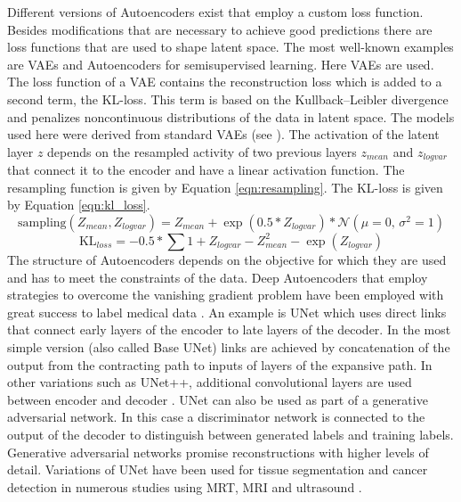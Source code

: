 Different versions of Autoencoders exist that employ a custom loss function. Besides modifications that are necessary to achieve good predictions there are loss functions that are used to shape latent space. The most well-known examples are VAEs and Autoencoders for semisupervised learning. Here VAEs are used. The loss function of a VAE contains the reconstruction loss which is added to a second term, the KL-loss. This term is based on the Kullback–Leibler divergence and penalizes noncontinuous distributions of the data in latent space. The models used here were derived from standard VAEs (see \cite{keras2021vaes}). The activation of the latent layer $z$ depends on the resampled activity of two previous layers $z_{mean}$ and $z_{logvar}$ that connect it to the encoder and have a linear activation function. The resampling function is given by Equation \ref{eqn:resampling}. The KL-loss is given by Equation \ref{eqn:kl_loss}.\\
\begin{equation}
\text{sampling}(Z_{mean}, Z_{log var}) = Z_{mean}+ \exp(0.5 * Z_{log var}) * \mathcal{N}(\mu = 0,\,\sigma^{2}=1)
\label{eqn:resampling}
\end{equation}
\begin{equation}
  \text{KL}_{loss} = -0.5 * \sum 1 + Z_{log var} - Z_{mean}^2 - \exp(Z_{log var})
\label{eqn:kl_loss}
\end{equation}
The structure of Autoencoders depends on the objective for which they are used and has to meet the constraints of the data. Deep Autoencoders that employ strategies to overcome the vanishing gradient problem have been employed with great success to label medical data \parencite{du2020medical}. An example is UNet which uses direct links that connect early layers of the encoder to late layers of the decoder. In the most simple version (also called Base UNet) links are achieved by concatenation of the output from the contracting path to inputs of layers of the expansive path. In other variations such as UNet++, additional convolutional layers are used between encoder and decoder \parencite{du2020medical}. UNet can also be used as part of a generative adversarial network. In this case a discriminator network is connected to the output of the decoder to distinguish between generated labels and training labels. Generative adversarial networks promise reconstructions with higher levels of detail. Variations of UNet have been used for tissue segmentation and cancer detection in numerous studies using MRT, MRI and ultrasound \parencite{du2020medical}. \\
